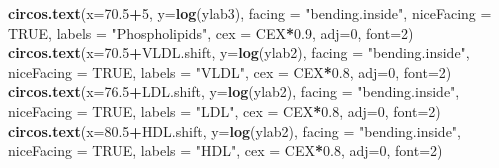 \documentclass[
]{article}
\newenvironment{Shaded}{\begin{snugshade}}{\end{snugshade}}
\newcommand{\DataTypeTok}[1]{\textcolor[rgb]{0.13,0.29,0.53}{#1}}
\newcommand{\DecValTok}[1]{\textcolor[rgb]{0.00,0.00,0.81}{#1}}
\newcommand{\FloatTok}[1]{\textcolor[rgb]{0.00,0.00,0.81}{#1}}
\newcommand{\KeywordTok}[1]{\textcolor[rgb]{0.13,0.29,0.53}{\textbf{#1}}}
\newcommand{\NormalTok}[1]{#1}
\newcommand{\OperatorTok}[1]{\textcolor[rgb]{0.81,0.36,0.00}{\textbf{#1}}}
\newcommand{\OtherTok}[1]{\textcolor[rgb]{0.56,0.35,0.01}{#1}}
\newcommand{\StringTok}[1]{\textcolor[rgb]{0.31,0.60,0.02}{#1}}
\begin{document}
\begin{Shaded}
\begin{Highlighting}[]
\KeywordTok{circos.text}\NormalTok{(}\DataTypeTok{x=}\FloatTok{70.5}\OperatorTok{+}\DecValTok{5}\NormalTok{, }\DataTypeTok{y=}\KeywordTok{log}\NormalTok{(ylab3), }\DataTypeTok{facing =} \StringTok{"bending.inside"}\NormalTok{, }\DataTypeTok{niceFacing =} \OtherTok{TRUE}\NormalTok{, }\DataTypeTok{labels =} \StringTok{"Phospholipids"}\NormalTok{, }\DataTypeTok{cex =}\NormalTok{ CEX}\OperatorTok{*}\FloatTok{0.9}\NormalTok{, }\DataTypeTok{adj=}\DecValTok{0}\NormalTok{, }\DataTypeTok{font=}\DecValTok{2}\NormalTok{)}
\KeywordTok{circos.text}\NormalTok{(}\DataTypeTok{x=}\FloatTok{70.5}\OperatorTok{+}\NormalTok{VLDL.shift, }\DataTypeTok{y=}\KeywordTok{log}\NormalTok{(ylab2), }\DataTypeTok{facing =} \StringTok{"bending.inside"}\NormalTok{, }\DataTypeTok{niceFacing =} \OtherTok{TRUE}\NormalTok{, }\DataTypeTok{labels =} \StringTok{"VLDL"}\NormalTok{, }\DataTypeTok{cex =}\NormalTok{ CEX}\OperatorTok{*}\FloatTok{0.8}\NormalTok{, }\DataTypeTok{adj=}\DecValTok{0}\NormalTok{, }\DataTypeTok{font=}\DecValTok{2}\NormalTok{)}
\KeywordTok{circos.text}\NormalTok{(}\DataTypeTok{x=}\FloatTok{76.5}\OperatorTok{+}\NormalTok{LDL.shift, }\DataTypeTok{y=}\KeywordTok{log}\NormalTok{(ylab2), }\DataTypeTok{facing =} \StringTok{"bending.inside"}\NormalTok{, }\DataTypeTok{niceFacing =} \OtherTok{TRUE}\NormalTok{, }\DataTypeTok{labels =} \StringTok{"LDL"}\NormalTok{, }\DataTypeTok{cex =}\NormalTok{ CEX}\OperatorTok{*}\FloatTok{0.8}\NormalTok{, }\DataTypeTok{adj=}\DecValTok{0}\NormalTok{, }\DataTypeTok{font=}\DecValTok{2}\NormalTok{)}
\KeywordTok{circos.text}\NormalTok{(}\DataTypeTok{x=}\FloatTok{80.5}\OperatorTok{+}\NormalTok{HDL.shift, }\DataTypeTok{y=}\KeywordTok{log}\NormalTok{(ylab2), }\DataTypeTok{facing =} \StringTok{"bending.inside"}\NormalTok{, }\DataTypeTok{niceFacing =} \OtherTok{TRUE}\NormalTok{, }\DataTypeTok{labels =} \StringTok{"HDL"}\NormalTok{, }\DataTypeTok{cex =}\NormalTok{ CEX}\OperatorTok{*}\FloatTok{0.8}\NormalTok{, }\DataTypeTok{adj=}\DecValTok{0}\NormalTok{, }\DataTypeTok{font=}\DecValTok{2}\NormalTok{) }


\end{Highlighting}
\end{Shaded}
\end{document}
